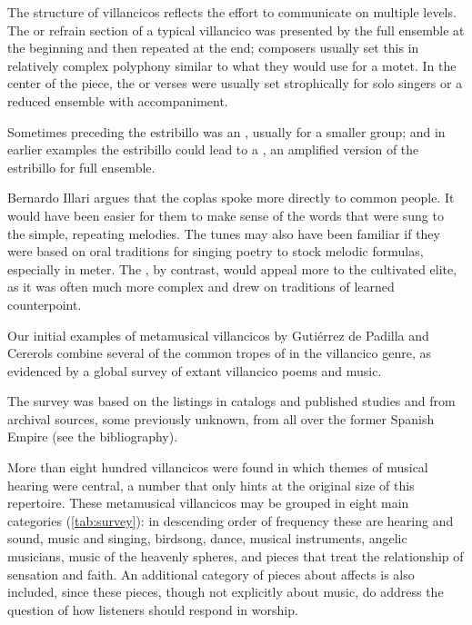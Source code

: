 The structure of villancicos reflects the effort to communicate on multiple
levels.
The  or refrain section of a typical villancico was presented
by the full ensemble at the beginning and then repeated at the end; composers
usually set this in relatively complex polyphony similar to what they would use
for a motet.
In the center of the piece, the  or verses were usually set
strophically for solo singers or a reduced ensemble with accompaniment.%
\begin{Footnote}
    Sometimes preceding the estribillo was an , usually for
    a smaller group; and in earlier examples the estribillo could lead to a
    , an amplified version of the estribillo for full
    ensemble.
\end{Footnote}
Bernardo Illari argues that the coplas spoke more directly to common people.%
    \Autocite{Illari:Popular}
It would have been easier for them to make sense of the words that were sung to
the simple, repeating melodies.
The tunes may also have been familiar if they were based on oral traditions for
singing poetry to stock melodic formulas, especially in  meter.
The , by contrast, would appeal more to the cultivated elite,
as it was often much more complex and drew on traditions of learned
counterpoint.

Our initial examples of metamusical villancicos by Gutiérrez de Padilla and
Cererols combine several of the common tropes of  in
the villancico genre, as evidenced by a global survey of extant villancico
poems and music.%
\begin{Footnote}
    The survey was based on the listings in catalogs and published studies and
    from archival sources, some previously unknown, from all over the former
    Spanish Empire (see the bibliography).
\end{Footnote}
More than eight hundred villancicos were found in which themes of musical
hearing were central, a number that only hints at the original size of this
repertoire.
These metamusical villancicos may be grouped in eight main categories
(\cref{tab:survey}): in descending order of frequency these are hearing and
sound, music and singing, birdsong, dance, musical instruments, angelic
musicians, music of the heavenly spheres, and pieces that treat the
relationship of sensation and faith.
An additional category of pieces about affects is also included, since these
pieces, though not explicitly about music, do address the question of how
listeners should respond in worship. 

